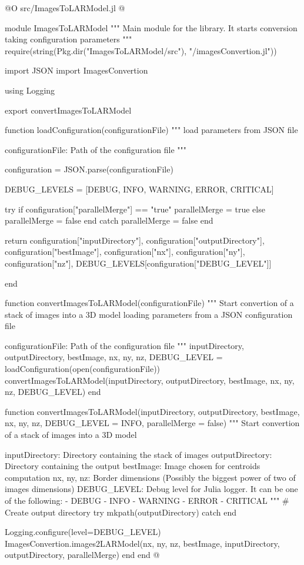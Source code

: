 \documentclass[11pt,oneside]{article}	%
\begin{document}
@O src/ImagesToLARModel.jl
@{module ImagesToLARModel
"""
Main module for the library. It starts conversion
taking configuration parameters
"""
require(string(Pkg.dir("ImagesToLARModel/src"), "/imagesConvertion.jl"))

import JSON
import ImagesConvertion

using Logging

export convertImagesToLARModel

function loadConfiguration(configurationFile)
  """
  load parameters from JSON file
  
  configurationFile: Path of the configuration file
  """

  configuration = JSON.parse(configurationFile)
  
  DEBUG_LEVELS = [DEBUG, INFO, WARNING, ERROR, CRITICAL]
  
  try
    if configuration["parallelMerge"] == "true"
      parallelMerge = true
    else
      parallelMerge = false
    end
  catch
    parallelMerge = false
  end

  return configuration["inputDirectory"], configuration["outputDirectory"], configuration["bestImage"],
        configuration["nx"], configuration["ny"], configuration["nz"],
        DEBUG_LEVELS[configuration["DEBUG_LEVEL"]]

end

function convertImagesToLARModel(configurationFile)
  """
  Start convertion of a stack of images into a 3D model
  loading parameters from a JSON configuration file
  
  configurationFile: Path of the configuration file
  """
  inputDirectory, outputDirectory, bestImage, nx, ny, nz, DEBUG_LEVEL = loadConfiguration(open(configurationFile))
  convertImagesToLARModel(inputDirectory, outputDirectory, bestImage, nx, ny, nz, DEBUG_LEVEL)
end

function convertImagesToLARModel(inputDirectory, outputDirectory, bestImage,
                                 nx, ny, nz, DEBUG_LEVEL = INFO, parallelMerge = false)
  """
  Start convertion of a stack of images into a 3D model
  
  inputDirectory: Directory containing the stack of images
  outputDirectory: Directory containing the output
  bestImage: Image chosen for centroids computation
  nx, ny, nz: Border dimensions (Possibly the biggest power of two of images dimensions)
  DEBUG_LEVEL: Debug level for Julia logger. It can be one of the following:
    - DEBUG
    - INFO
    - WARNING
    - ERROR
    - CRITICAL
  """
  # Create output directory
  try
    mkpath(outputDirectory)
  catch
  end

  Logging.configure(level=DEBUG_LEVEL)
  ImagesConvertion.images2LARModel(nx, ny, nz, bestImage, inputDirectory, outputDirectory, parallelMerge)
end
end
@}
\end{document}
